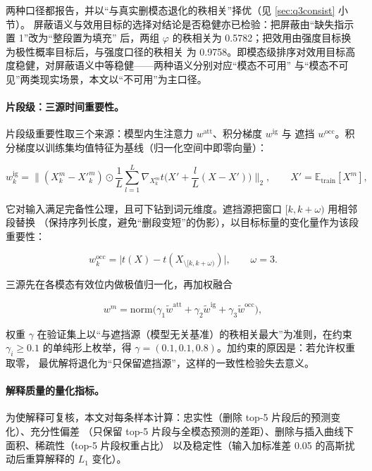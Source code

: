 \documentclass[withoutpreface,bwprint]{cumcmthesis}
\begin{document}
两种口径都报告，并以“与真实删模态退化的秩相关”择优（见 \ref{sec:q3consist} 小节）。
屏蔽语义与效用目标的选择对结论是否稳健亦已检验：把屏蔽由“缺失指示置 1”改为“整段置为填充”
后，两组 $\varphi$ 的秩相关为 0.5782；把效用由强度目标换为极性概率目标后，与强度口径的秩相关
为 0.9758。即模态级排序对效用目标高度稳健，对屏蔽语义中等稳健——两种语义分别对应“模态不可用”
与“模态不可见”两类现实场景，本文以“不可用”为主口径。

\paragraph{片段级：三源时间重要性。}
片段级重要性取三个来源：模型内生注意力 $w^{\mathrm{att}}$、积分梯度 $w^{\mathrm{ig}}$ 与
遮挡 $w^{\mathrm{occ}}$。积分梯度以训练集均值特征为基线（归一化空间中即零向量）：

\begin{equation}
\label{eq:q3ig}
w^{\mathrm{ig}}_{k}=\Big\lVert (X^{m}_{k}-X'^{m}_{k})
\odot\frac{1}{L}\sum_{l=1}^{L}\nabla_{X^{m}_{k}}t\Big(X'+\frac{l}{L}(X-X')\Big)\Big\rVert_{2},
\qquad X'=\mathbb{E}_{\text{train}}[X^{m}],
\end{equation}

它对输入满足完备性公理，且可下钻到词元维度。遮挡源把窗口 $[k,k+\omega)$ 用相邻段替换
（保持序列长度，避免“删段变短”的伪影），以目标标量的变化量作为该段重要性：

\begin{equation}
\label{eq:q3occ}
w^{\mathrm{occ}}_{k}=\big\lvert t(X)-t(X_{\setminus[k,k+\omega)})\big\rvert,\qquad \omega=3.
\end{equation}

三源先在各模态有效位内做极值归一化，再加权融合

\begin{equation}
\label{eq:q3fuse}
w^{m}=\mathrm{norm}\Big(\gamma_{1}\tilde w^{\mathrm{att}}+\gamma_{2}\tilde w^{\mathrm{ig}}
+\gamma_{3}\tilde w^{\mathrm{occ}}\Big),
\end{equation}

权重 $\gamma$ 在验证集上以“与遮挡源（模型无关基准）的秩相关最大”为准则，在约束
$\gamma_{i}\ge 0.1$ 的单纯形上枚举，得 $\gamma=(0.1, 0.1, 0.8)$。加约束的原因是：若允许权重取零，
最优解将退化为“只保留遮挡源”，这样的一致性检验失去意义。

\paragraph{解释质量的量化指标。}
为使解释可复核，本文对每条样本计算：忠实性（删除 top-5 片段后的预测变化）、充分性偏差
（只保留 top-5 片段与全模态预测的差距）、删除与插入曲线下面积、稀疏性（top-5 片段权重占比）
以及稳定性（输入加标准差 0.05 的高斯扰动后重算解释的 $L_{1}$ 变化）。
\end{document}
